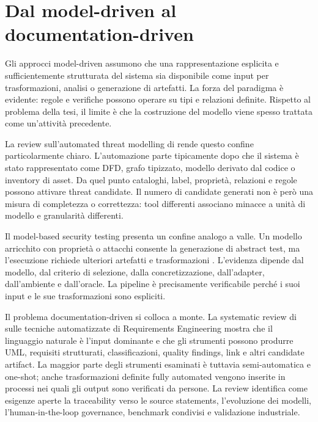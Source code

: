 \documentclass[12pt,a4paper,oneside]{report}
\begin{document}
\section{Dal model-driven al documentation-driven}

Gli approcci model-driven assumono che una rappresentazione esplicita e sufficientemente strutturata del sistema sia disponibile come input per trasformazioni, analisi o generazione di artefatti. La forza del paradigma è evidente: regole e verifiche possono operare su tipi e relazioni definite. Rispetto al problema della tesi, il limite è che la costruzione del modello viene spesso trattata come un'attività precedente.

La review sull'automated threat modelling di \citet{granata2024automatedthreatmodelling} rende questo confine particolarmente chiaro. L'automazione parte tipicamente dopo che il sistema è stato rappresentato come DFD, grafo tipizzato, modello derivato dal codice o inventory di asset. Da quel punto cataloghi, label, proprietà, relazioni e regole possono attivare threat candidate. Il numero di candidate generati non è però una misura di completezza o correttezza: tool differenti associano minacce a unità di modello e granularità differenti.

Il model-based security testing presenta un confine analogo a valle. Un modello arricchito con proprietà o attacchi consente la generazione di abstract test, ma l'esecuzione richiede ulteriori artefatti e trasformazioni \citep{lonetti2023mbstiot}. L'evidenza dipende dal modello, dal criterio di selezione, dalla concretizzazione, dall'adapter, dall'ambiente e dall'oracle. La pipeline è precisamente verificabile perché i suoi input e le sue trasformazioni sono espliciti.

Il problema documentation-driven si colloca a monte. La systematic review di \citet{umar2024automatedrequirements} sulle tecniche automatizzate di Requirements Engineering mostra che il linguaggio naturale è l'input dominante e che gli strumenti possono produrre UML, requisiti strutturati, classificazioni, quality findings, link e altri candidate artifact. La maggior parte degli strumenti esaminati è tuttavia semi-automatica e one-shot; anche trasformazioni definite fully automated vengono inserite in processi nei quali gli output sono verificati da persone. La review identifica come esigenze aperte la traceability verso le source statements, l'evoluzione dei modelli, l'human-in-the-loop governance, benchmark condivisi e validazione industriale.
\end{document}

